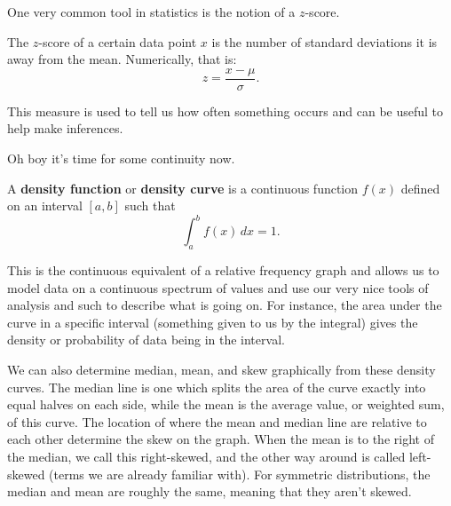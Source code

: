 One very common tool in statistics is the notion of a \( z \)-score.

\begin{blackbox}
    \begin{definition}
        The \( z \)-score of a certain data point \( x \) is the number of
        standard deviations it is away from the mean. Numerically, that is:
        \[
            z = \frac{x - \mu}{\sigma}
        .\]
    \end{definition}
\end{blackbox}

This measure is used to tell us how often something occurs and can be useful to
help make inferences.

Oh boy it's time for some continuity now.

\begin{blackbox}
    \begin{definition}
        A \textbf{density function} or \textbf{density curve} is a continuous function \( f \left( x \right) \) defined on an interval \( \left[ a, b \right] \) such that
        \[
            \int_{a}^{b} f \left( x \right) \, dx = 1
        .\]
    \end{definition}
\end{blackbox}

\begin{center}
\end{center}

This is the continuous equivalent of a relative frequency graph and allows us
to model data on a continuous spectrum of values and use our very nice tools of
analysis and such to describe what is going on. For instance, the area under
the curve in a specific interval (something given to us by the integral) gives
the density or probability of data being in the interval.

We can also determine median, mean, and skew graphically from these density
curves. The median line is one which splits the area of the curve exactly into
equal halves on each side, while the mean is the average value, or weighted
sum, of this curve. The location of where the mean and median line are relative
to each other determine the skew on the graph. When the mean is to the right of
the median, we call this right-skewed, and the other way around is called
left-skewed (terms we are already familiar with). For symmetric distributions,
the median and mean are roughly the same, meaning that they aren't skewed.

